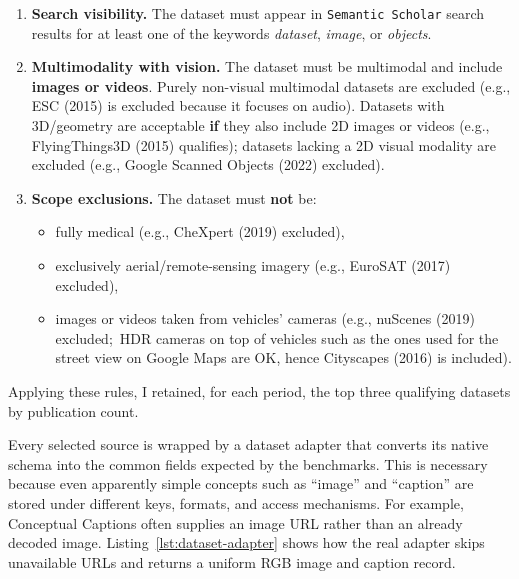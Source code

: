 ﻿\documentclass[11pt,a4paper]{article}
\begin{document}
\begin{enumerate}
  \item \textbf{Search visibility.} The dataset must appear in \texttt{Semantic Scholar} search results for at least one of the keywords \emph{dataset}, \emph{image}, or \emph{objects}.
  \item \textbf{Multimodality with vision.} The dataset must be multimodal and include \textbf{images or videos}. Purely non-visual multimodal datasets are excluded (e.g., ESC (2015) is excluded because it focuses on audio). Datasets with 3D/geometry are acceptable \textbf{if} they also include 2D images or videos (e.g., FlyingThings3D (2015) qualifies); datasets lacking a 2D visual modality are excluded (e.g., Google Scanned Objects (2022) excluded).
  \item \textbf{Scope exclusions.} The dataset must \textbf{not} be:
    \begin{itemize}
      \item fully medical (e.g., CheXpert (2019) excluded),
      \item exclusively aerial/remote-sensing imagery (e.g., EuroSAT (2017) excluded),
      \item images or videos taken from vehicles' cameras (e.g., nuScenes (2019) excluded;\, HDR cameras on top of vehicles such as the ones used for the street view on Google Maps are OK, hence Cityscapes (2016) is included).
    \end{itemize}
\end{enumerate}

Applying these rules, I retained, for each period, the top three qualifying datasets by publication count.

Every selected source is wrapped by a dataset adapter that converts its native
schema into the common fields expected by the benchmarks. This is necessary
because even apparently simple concepts such as ``image'' and ``caption'' are
stored under different keys, formats, and access mechanisms. For example,
Conceptual Captions often supplies an image URL rather than an already decoded
image. Listing~\ref{lst:dataset-adapter} shows how the real adapter skips
unavailable URLs and returns a uniform RGB image and caption record.
\end{document}
